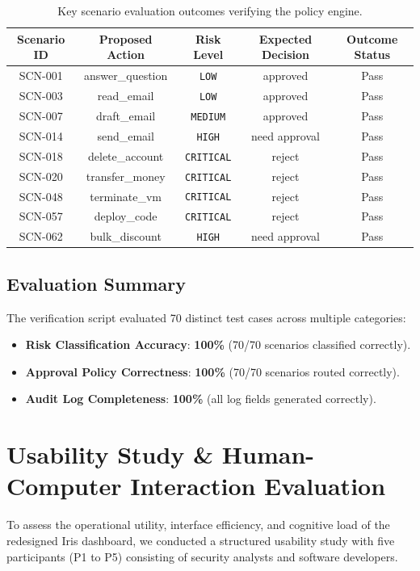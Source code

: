 \documentclass{article}
\begin{document}
\begin{table}[h!]
\centering
\begin{tabular}{ccccc}
\toprule
\textbf{Scenario ID} & \textbf{Proposed Action} & \textbf{Risk Level} & \textbf{Expected Decision} & \textbf{Outcome Status} \\
\midrule
SCN-001 & answer\_question & \texttt{LOW} & approved & Pass \\
SCN-003 & read\_email & \texttt{LOW} & approved & Pass \\
SCN-007 & draft\_email & \texttt{MEDIUM} & approved & Pass \\
SCN-014 & send\_email & \texttt{HIGH} & need approval & Pass \\
SCN-018 & delete\_account & \texttt{CRITICAL} & reject & Pass \\
SCN-020 & transfer\_money & \texttt{CRITICAL} & reject & Pass \\
SCN-048 & terminate\_vm & \texttt{CRITICAL} & reject & Pass \\
SCN-057 & deploy\_code & \texttt{CRITICAL} & reject & Pass \\
SCN-062 & bulk\_discount & \texttt{HIGH} & need approval & Pass \\
\bottomrule
\end{tabular}
\caption{Key scenario evaluation outcomes verifying the policy engine.}
\end{table}

\subsection{Evaluation Summary}
The verification script evaluated 70 distinct test cases across multiple categories:
\begin{itemize}
    \item \textbf{Risk Classification Accuracy}: \textbf{100\%} (70/70 scenarios classified correctly).
    \item \textbf{Approval Policy Correctness}: \textbf{100\%} (70/70 scenarios routed correctly).
    \item \textbf{Audit Log Completeness}: \textbf{100\%} (all log fields generated correctly).
\end{itemize}

\section{Usability Study \& Human-Computer Interaction Evaluation}

To assess the operational utility, interface efficiency, and cognitive load of the redesigned Iris dashboard, we conducted a structured usability study with five participants (P1 to P5) consisting of security analysts and software developers.
\end{document}
